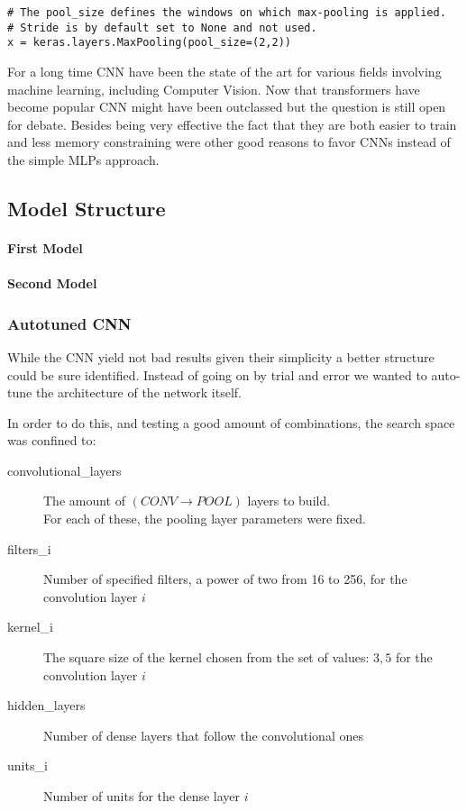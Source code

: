 \begin{verbatim}
# The pool_size defines the windows on which max-pooling is applied.
# Stride is by default set to None and not used.
x = keras.layers.MaxPooling(pool_size=(2,2))
\end{verbatim}




For a long time CNN have been the state of the art for various fields involving machine learning, including Computer Vision.
Now that transformers have become popular CNN might have been outclassed but the question is still open for debate.\cite{wang2023cnns}
Besides being very effective the fact that they are both easier to train and less memory constraining were other good reasons
to favor CNNs instead of the simple MLPs approach.

\subsection{Model Structure}
\paragraph{First Model}

\paragraph{Second Model}

\subsubsection{Autotuned CNN}
While the CNN yield not bad results given their simplicity a better structure could be sure identified.
Instead of going on by trial and error we wanted to auto-tune the architecture of the network itself.

In order to do this, and testing a good amount of combinations, the search space was confined to:
\begin{description}
    \item [convolutional\_layers] The amount of $(CONV \rightarrow POOL)$ layers to build.\\
    For each of these, the pooling layer parameters were fixed.
    \item[filters\_i] Number of specified filters, a power of two from 16 to 256, for the convolution layer $i$
    \item[kernel\_i] The square size of the kernel chosen from the set of values: ${3,5}$ for the convolution layer $i$
    \item[hidden\_layers] Number of dense layers that follow the convolutional ones
    \item[units\_i] Number of units for the dense layer $i$
\end{description}

